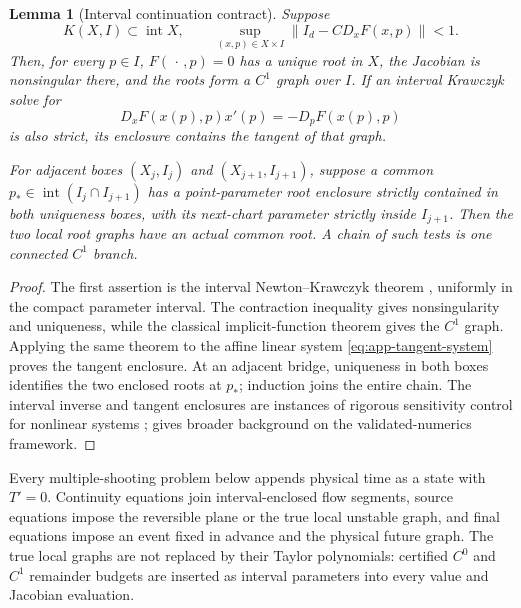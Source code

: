 \documentclass[11pt]{amsart}
\numberwithin{equation}{section}
\newtheorem{lemma}[theorem]{Lemma}
\theoremstyle{definition}
\theoremstyle{remark}
\begin{document}
\begin{lemma}[Interval continuation contract]
\label{lem:app-interval-contract}
Suppose
\begin{equation}\label{eq:app-krawczyk-inclusion}
 K(X,I)\subset\operatorname{int}X,\qquad
 \sup_{(x,p)\in X\times I}\|I_d-CD_xF(x,p)\|<1.
\end{equation}
Then, for every $p\in I$, $F(\,\cdot\,,p)=0$ has a unique root in $X$,
the Jacobian is nonsingular there, and the roots form a $C^1$ graph over
$I$.  If an interval Krawczyk solve for
\begin{equation}\label{eq:app-tangent-system}
 D_xF(x(p),p)x'(p)=-D_pF(x(p),p)
\end{equation}
is also strict, its enclosure contains the tangent of that graph.

For adjacent boxes $(X_j,I_j)$ and $(X_{j+1},I_{j+1})$, suppose a common
$p_*\in\operatorname{int}(I_j\cap I_{j+1})$ has a point-parameter root
enclosure strictly contained in both uniqueness boxes, with its
next-chart parameter strictly inside $I_{j+1}$.  Then the two local root
graphs have an actual common root.  A chain of such tests is one connected
$C^1$ branch.
\end{lemma}

\begin{proof}
The first assertion is the interval Newton--Krawczyk theorem
\cite{Krawczyk1980IntervalIterations}, uniformly in
the compact parameter interval.  The contraction inequality gives
nonsingularity and uniqueness, while the classical implicit-function
theorem gives the $C^1$ graph.  Applying the same theorem to the affine
linear system \eqref{eq:app-tangent-system} proves the tangent enclosure.
At an adjacent bridge, uniqueness in both boxes identifies the two
enclosed roots at $p_*$; induction joins the entire chain.
The interval inverse and tangent enclosures are instances of rigorous
sensitivity control for nonlinear systems \cite{Rump1990RigorousSensitivity};
\cite{Tucker2011Validated} gives broader background on the validated-numerics
framework.
\end{proof}

Every multiple-shooting problem below appends physical time as a state
with $T'=0$.  Continuity equations join interval-enclosed flow segments,
source equations impose the reversible plane or the true local unstable
graph, and final equations impose an event fixed in advance and the
physical future graph.
The true local graphs are not replaced by their Taylor polynomials:
certified $C^0$ and $C^1$ remainder budgets are inserted as interval
parameters into every value and Jacobian evaluation.
\end{document}
